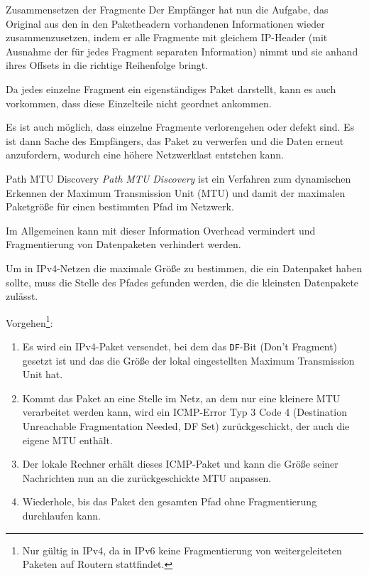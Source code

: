\begin{bonus}{Zusammensetzen der Fragmente}
    Der Empfänger hat nun die Aufgabe, das Original aus den in den Paketheadern vorhandenen Informationen wieder zusammenzusetzen, indem er alle Fragmente mit gleichem IP-Header (mit Ausnahme der für jedes Fragment separaten Information) nimmt und sie anhand ihres Offsets in die richtige Reihenfolge bringt.

    Da jedes einzelne Fragment ein eigenständiges Paket darstellt, kann es auch vorkommen, dass diese Einzelteile nicht geordnet ankommen.

    Es ist auch möglich, dass einzelne Fragmente verlorengehen oder defekt sind.
    Es ist dann Sache des Empfängers, das Paket zu verwerfen und die Daten erneut anzufordern, wodurch eine höhere Netzwerklast entstehen kann.
\end{bonus}

\begin{defi}{Path MTU Discovery}
    \emph{Path MTU Discovery} ist ein Verfahren zum dynamischen Erkennen der Maximum Transmission Unit (MTU) und damit der maximalen Paketgröße für einen bestimmten Pfad im Netzwerk.

    Im Allgemeinen kann mit dieser Information Overhead vermindert und Fragmentierung von Datenpaketen verhindert werden.

    Um in IPv4-Netzen die maximale Größe zu bestimmen, die ein Datenpaket haben sollte, muss die Stelle des Pfades gefunden werden, die die kleinsten Datenpakete zulässt.

    Vorgehen\footnote{Nur gültig in IPv4, da in IPv6 keine Fragmentierung von weitergeleiteten Paketen auf Routern stattfindet.}:
    \begin{enumerate}
        \item Es wird ein IPv4-Paket versendet, bei dem das \texttt{DF}-Bit (Don't Fragment) gesetzt ist und das die Größe der lokal eingestellten Maximum Transmission Unit hat.
        \item Kommt das Paket an eine Stelle im Netz, an dem nur eine kleinere MTU verarbeitet werden kann, wird ein ICMP-Error Typ 3 Code 4 (Destination Unreachable Fragmentation Needed, DF Set) zurückgeschickt, der auch die eigene MTU enthält.
        \item Der lokale Rechner erhält dieses ICMP-Paket und kann die Größe seiner Nachrichten nun an die zurückgeschickte MTU anpassen.
        \item Wiederhole, bis das Paket den gesamten Pfad ohne Fragmentierung durchlaufen kann.
    \end{enumerate}
\end{defi}

